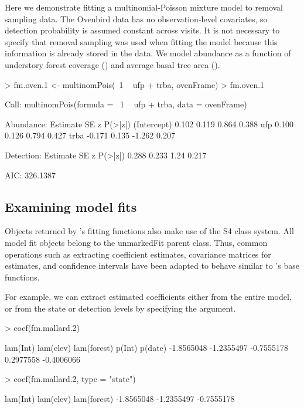 \documentclass[article,shortnames]{jss}
\newcommand{\um}{\pkg{unmarked}}
\newcommand{\rlang}{\proglang{R}}
\begin{document}
Here we demonstrate fitting a multinomial-Poisson mixture model to removal 
sampling data.  The Ovenbird data has no observation-level covariates, so 
detection probability is assumed constant across visits.  It is not necessary
to specify that removal sampling was used when fitting the model
because this information is already stored in the  data.
We model abundance as a function of understory forest coverage ()
and average basal tree area ().

\begin{Schunk}
\begin{Sinput}
> fm.oven.1 <- multinomPois(~1 ~ ufp + trba, ovenFrame)
> fm.oven.1
\end{Sinput}
\begin{Soutput}
Call:
multinomPois(formula = ~1 ~ ufp + trba, data = ovenFrame)

Abundance:
            Estimate    SE      z P(>|z|)
(Intercept)    0.102 0.119  0.864   0.388
ufp            0.100 0.126  0.794   0.427
trba          -0.171 0.135 -1.262   0.207

Detection:
 Estimate    SE    z P(>|z|)
    0.288 0.233 1.24   0.217

AIC: 326.1387 
\end{Soutput}
\end{Schunk}

\subsection{Examining model fits}
\label{sec:examining-model-fits}

Objects returned by \um's fitting functions also make use of the S4
class system.  All model fit objects belong to the unmarkedFit parent
class.  Thus, common operations such as extracting coefficient
estimates, covariance matrices for estimates, and confidence intervals
have been adapted to behave similar to \rlang's base functions.

For example, we can extract estimated coefficients either from the
entire model, or from the state or detection levels by specifying the
 argument.

\begin{Schunk}
\begin{Sinput}
> coef(fm.mallard.2)
\end{Sinput}
\begin{Soutput}
   lam(Int)   lam(elev) lam(forest)      p(Int)     p(date) 
 -1.8565048  -1.2355497  -0.7555178   0.2977558  -0.4006066 
\end{Soutput}
\begin{Sinput}
> coef(fm.mallard.2, type = "state")
\end{Sinput}
\begin{Soutput}
   lam(Int)   lam(elev) lam(forest) 
 -1.8565048  -1.2355497  -0.7555178 
\end{Soutput}
\end{Schunk}
\end{document}
